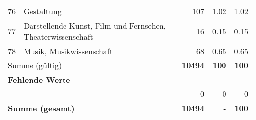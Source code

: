 \begin{longtable}{lXrrr}
        76 & \multicolumn{1}{X}{Gestaltung} & %
          \num{107} &
          \num[round-mode=places,round-precision=2]{1.02} &
          \num[round-mode=places,round-precision=2]{1.02} \\

        77 & \multicolumn{1}{X}{Darstellende Kunst, Film und Fernsehen, Theaterwissenschaft} & %
          \num{16} &
          \num[round-mode=places,round-precision=2]{0.15} &
          \num[round-mode=places,round-precision=2]{0.15} \\

        78 & \multicolumn{1}{X}{Musik, Musikwissenschaft} & %
          \num{68} &
          \num[round-mode=places,round-precision=2]{0.65} &
          \num[round-mode=places,round-precision=2]{0.65} \\

     \midrule
     \multicolumn{2}{l}{Summe (gültig)} &
       \textbf{\num{10494}} &
     \textbf{\num{100}} &
       \textbf{\num[round-mode=places,round-precision=2]{100}} \\
     \multicolumn{5}{l}{\textbf{Fehlende Werte}}\\
      & & 0 & 0 & 0 \\
     \midrule
     \multicolumn{2}{l}{\textbf{Summe (gesamt)}} &
          \textbf{\num{10494}} &
        \textbf{-} &
        \textbf{\num{100}} \\
     \bottomrule
     \end{longtable}
     
